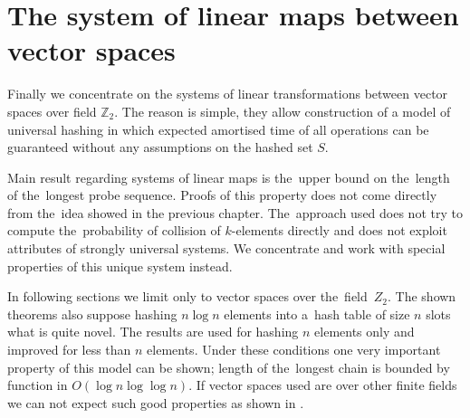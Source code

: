 \chapter{The system of linear maps between vector spaces}
Finally we concentrate on the systems of linear transformations between vector spaces over field $\mathbb{Z}_2$. The reason is simple, they allow construction of a model of universal hashing in which expected amortised time of all operations can be guaranteed without any assumptions on the hashed set $S$. 

Main result regarding systems of linear maps is the~upper bound on the~length of the~longest probe sequence. Proofs of this property does not come directly from the~idea showed in the previous chapter. The~approach used does not try to compute the~probability of collision of $k$-elements directly and does not exploit attributes of strongly universal systems. We concentrate and work with special properties of this unique system instead.

In following sections we limit only to vector spaces over the~field~$Z_2$. The shown theorems also suppose hashing $n \log n$ elements into a~hash table of size $n$ slots what is quite novel. The results are used for hashing $n$ elements only and improved for less than $n$ elements. Under these conditions one very important property of this model can be shown; length of the~longest chain is bounded by function in $O(\log n \log \log n)$. If vector spaces used are over other finite fields we can not expect such good properties as shown in \cite{DBLP:journals/jacm/AlonDMPT99}.




